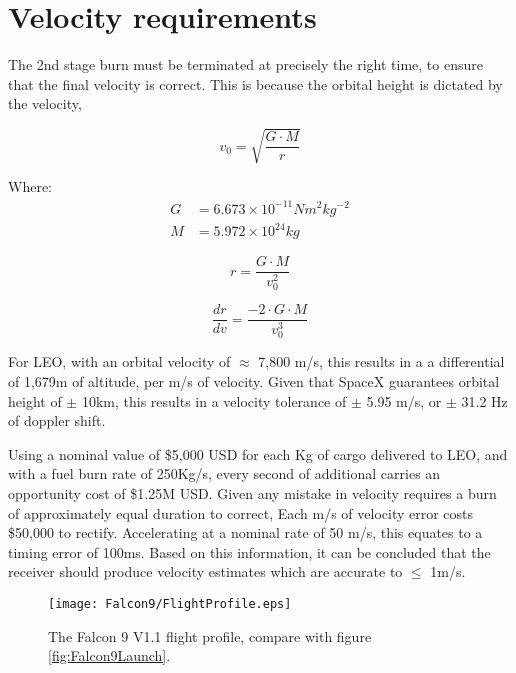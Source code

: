 \clearpage
\section{Velocity requirements}
The 2nd stage burn must be terminated at precisely the right time, to ensure that the final velocity is correct. This is because the orbital height is dictated by the velocity, 

\begin{equation}
v_0 = \sqrt{\frac{G \cdot M}{r}}
\end{equation}

Where:
\begin{align*}
G &= 6.673 \times 10^{-11} N m^2 kg^{-2}\\
M &= 5.972 \times 10^{24} kg
\end{align*}

\begin{equation}
r = \frac{G \cdot M}{v_0^2}
\end{equation}

\begin{equation}
\frac{dr}{dv} = \frac{-2 \cdot G \cdot M}{v_0^3}
\end{equation}

For \ac{LEO}, with an orbital velocity of $\approx$ 7,800 m/s, this results in a a differential of 1,679m of altitude, per m/s of velocity. Given that SpaceX guarantees orbital height of $\pm$ 10km, this results in a velocity tolerance of $\pm$ 5.95 m/s, or $\pm$ 31.2 Hz of doppler shift. 

Using a nominal value of \$5,000 USD for each Kg of cargo delivered to \ac{LEO}, and with a fuel burn rate of 250Kg/s, every second of additional carries an opportunity cost of \$1.25M USD. Given any mistake in velocity requires a burn of approximately equal duration to correct, Each m/s of velocity error costs \$50,000 to rectify. Accelerating at a nominal rate of 50 m/s, this equates to a timing error of 100ms. Based on this information, it can be concluded that the receiver should produce velocity estimates which are accurate to $\leq$ 1m/s.




\begin{figure}[!htb] 
    \centering
    \texttt{[image: Falcon9/FlightProfile.eps]} 
    \caption{The Falcon 9 V1.1 flight profile, compare with figure \ref{fig:Falcon9Launch}.}
    \label{fig:Falcon9FlightProfile}
\end{figure}


